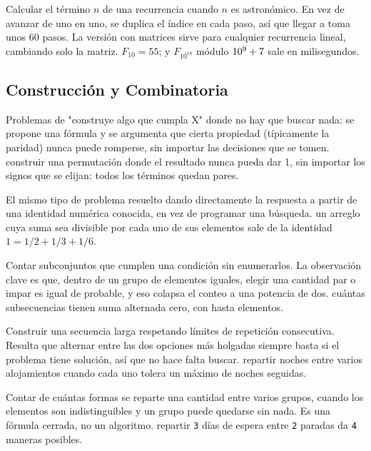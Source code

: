 Calcular el término $n$ de una recurrencia cuando $n$ es astronómico. En vez de
avanzar de uno en uno, se duplica el índice en cada paso, así que llegar a 
toma unos 60 pasos. La versión con matrices sirve para cualquier recurrencia lineal,
cambiando solo la matriz.
\ej $F_{10} = 55$; y $F_{10^{18}}$ módulo $10^{9}+7$ sale en milisegundos.

\subsection*{Construcción y Combinatoria}

Problemas de "construye algo que cumpla X" donde no hay que buscar nada: se propone
una fórmula y se argumenta que cierta propiedad (típicamente la paridad) nunca
puede romperse, sin importar las decisiones que se tomen.
\ej construir una permutación donde el resultado nunca pueda dar 1, sin
importar los signos que se elijan: todos los términos quedan pares.

El mismo tipo de problema resuelto dando directamente la respuesta a partir de una
identidad numérica conocida, en vez de programar una búsqueda.
\ej un arreglo cuya suma sea divisible por cada uno de sus elementos sale de la
identidad $1 = 1/2 + 1/3 + 1/6$.

Contar subconjuntos que cumplen una condición sin enumerarlos. La observación clave
es que, dentro de un grupo de elementos iguales, elegir una cantidad par o impar es
igual de probable, y eso colapsa el conteo a una potencia de dos.
\ej cuántas subsecuencias tienen suma alternada cero, con hasta  elementos.

Construir una secuencia larga respetando límites de repetición consecutiva. Resulta
que alternar entre las dos opciones más holgadas siempre basta si el problema tiene
solución, así que no hace falta buscar.
\ej repartir noches entre varios alojamientos cuando cada uno tolera un máximo de
noches seguidas.

Contar de cuántas formas se reparte una cantidad entre varios grupos, cuando los
elementos son indistinguibles y un grupo puede quedarse sin nada. Es una fórmula
cerrada, no un algoritmo.
\ej repartir \texttt{3} días de espera entre \texttt{2} paradas da \texttt{4}
maneras posibles.

